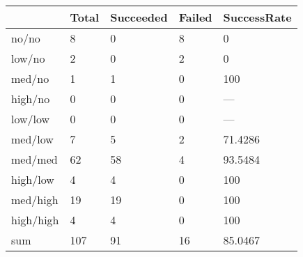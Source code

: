 \begin{tabular}{lllll}
& Total & Succeeded & Failed & SuccessRate \\ 
\hline 
no/no & 8 & 0 & 8 & 0 \\ 
low/no & 2 & 0 & 2 & 0 \\ 
med/no & 1 & 1 & 0 & 100 \\ 
high/no & 0 & 0 & 0 & --- \\ 
low/low & 0 & 0 & 0 & --- \\ 
med/low & 7 & 5 & 2 & 71.4286 \\ 
med/med & 62 & 58 & 4 & 93.5484 \\ 
high/low & 4 & 4 & 0 & 100 \\ 
med/high & 19 & 19 & 0 & 100 \\ 
high/high & 4 & 4 & 0 & 100 \\ 
sum & 107 & 91 & 16 & 85.0467 \\ 
\hline 
\end{tabular}